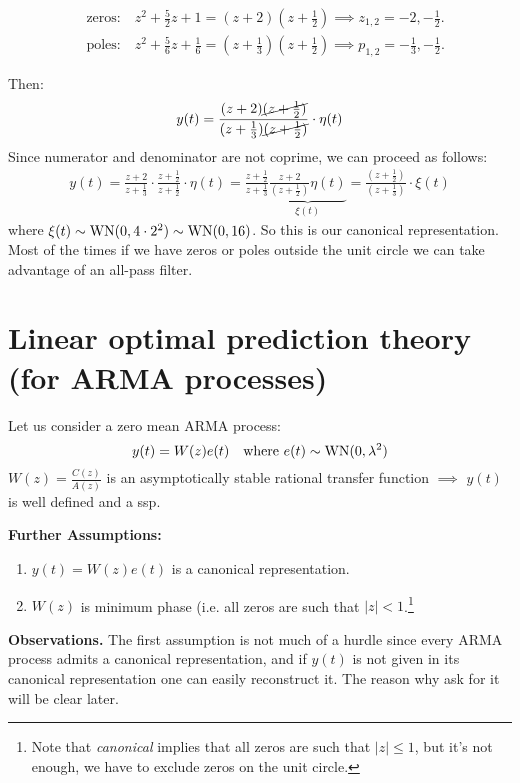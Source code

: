 \begin{align*}
	&\text{zeros:}\quad z^2+\frac{5}{2}z+1=(z+2)(z+\frac{1}{2}) \implies z_{1,2}=-2,-\frac{1}{2}.\\
	&\text{poles:}\quad z^2+\frac{5}{6}z+\frac{1}{6}=(z+\frac{1}{3})(z+\frac{1}{2}) \implies p_{1,2}=-\frac{1}{3},-\frac{1}{2}.
\end{align*}

Then:
\begin{align*}
	y(t)=\frac{(z+2)\cancel{(z+\frac{1}{2})}}{(z+\frac{1}{3})\cancel{(z+\frac{1}{2})}}\cdot \eta(t) 
\end{align*}
Since numerator and denominator are not coprime, we can proceed as follows:
\begin{align*}
	y(t)=\frac{z+2}{z+\frac{1}{3}}\cdot\frac{z+\frac{1}{2} }{z+\frac{1}{2}}\cdot\eta(t)=\frac{z+\frac{1}{2}}{z+\frac{1}{3}}\underbrace{\frac{z+2}{(z+\frac{1}{2})}\eta(t)}_{\xi(t)}=\frac{(z+\frac{1}{2})}{(z+\frac{1}{3})}\cdot \xi(t)
\end{align*}
where $\xi(t)\sim \operatorname{WN}(0,4\cdot2^2)\sim \operatorname{WN}(0,16)$. So this is our canonical representation. Most of the times if we have zeros or poles outside the unit circle we can take advantage of an all-pass filter.

\section{Linear optimal prediction theory (for ARMA processes)}
Let us consider a zero mean ARMA process:
\[
	y(t)=W(z)e(t) \quad \text{where }e(t)\sim \operatorname{WN}(0,\lambda^{2} )
\]
$W(z)=\frac{C(z)}{A(z)}$ is an asymptotically stable rational transfer function $\implies$ $y(t)$ is well defined and a \gls{ssp}.

\textbf{Further Assumptions:}\label{further-assumptions-prediction-theory}
\begin{enumerate}
	\item $y(t) = W(z)e(t)$ is a canonical representation.
	\item $W(z)$ is minimum phase (i.e. all zeros are such that $|z|<1$.\footnote{Note that \emph{canonical} implies that all zeros are such that $|z|\le 1$, but it's not enough, we have to exclude zeros on the unit circle.}
\end{enumerate}
 
\textbf{Observations.}
The first assumption is not much of a hurdle since every ARMA process admits a canonical representation, and if $y(t)$ is not given in its canonical representation one can easily reconstruct it. The reason why ask for it will be clear later. 


